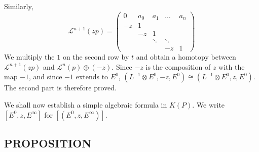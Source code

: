 Similarly,
\begin{equation*}
    \mathcal{L}^{n+1}(zp) =
    \begin{pmatrix}
        0   & a_0 & a_1 & \ldots & a_n \\
        -z  &  1  &     &        &     \\
            & -z  &  1  &        &     \\
            &     &\ddots& \ddots&     \\
            &     &     &   -z   &  1
    \end{pmatrix}
\end{equation*}
We multiply the $1$ on the second row by $t$ and obtain a homotopy between $\mathcal{L}^{n+1}(zp)$ and $\mathcal{L}^n(p) \oplus (-z)$. Since $-z$ is the composition of $z$ with the map $-1$, and since $-1$ extends to $E^0$, $(L^{-1} \otimes E^0, -z, E^0) \cong (L^{-1} \otimes E^0, z, E^0)$. The second part is therefore proved. \par 

We shall now establish a simple algebraic formula in $K(P)$. We write $[E^0, z, E^\infty]$ for $[(E^0, z, E^\infty)]$.

\subsection{PROPOSITION}\label{pro:2.2.7}
